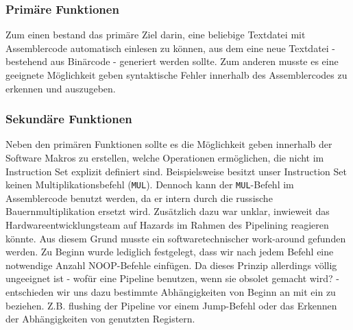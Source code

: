 \documentclass[paper=a4,fontsize=12pt,twocolumn]{scrreprt}
\begin{document}
\subsubsection{Primäre Funktionen}
Zum einen bestand das primäre Ziel darin, eine beliebige Textdatei mit Assemblercode automatisch einlesen zu können, aus dem eine neue Textdatei - bestehend aus Binärcode - generiert werden sollte. Zum anderen musste es eine geeignete Möglichkeit geben syntaktische Fehler innerhalb des Assemblercodes zu erkennen und auszugeben.

\subsubsection{Sekundäre Funktionen}
Neben den primären Funktionen sollte es die Möglichkeit geben innerhalb der Software Makros zu erstellen, welche Operationen ermöglichen, die nicht im Instruction Set explizit definiert sind. Beispielsweise besitzt unser Instruction Set keinen Multiplikationsbefehl (\texttt{MUL}).
Dennoch kann der \texttt{MUL}-Befehl im Assemblercode benutzt werden, da er intern durch die russische Bauernmultiplikation ersetzt wird.
Zusätzlich dazu war unklar, inwieweit das Hardwareentwicklungsteam auf Hazards im Rahmen des Pipelining reagieren könnte. Aus diesem Grund musste ein softwaretechnischer work-around gefunden werden.%
Zu Beginn wurde lediglich festgelegt, dass wir nach jedem Befehl eine notwendige Anzahl NOOP-Befehle einfügen.
Da dieses Prinzip allerdings völlig ungeeignet ist - wofür eine Pipeline benutzen, wenn sie obsolet gemacht wird? - entschieden wir uns dazu bestimmte Abhängigkeiten von Beginn an mit ein zu beziehen.
Z.B. flushing der Pipeline vor einem Jump-Befehl oder das Erkennen der Abhängigkeiten von genutzten Registern. %
\end{document}
